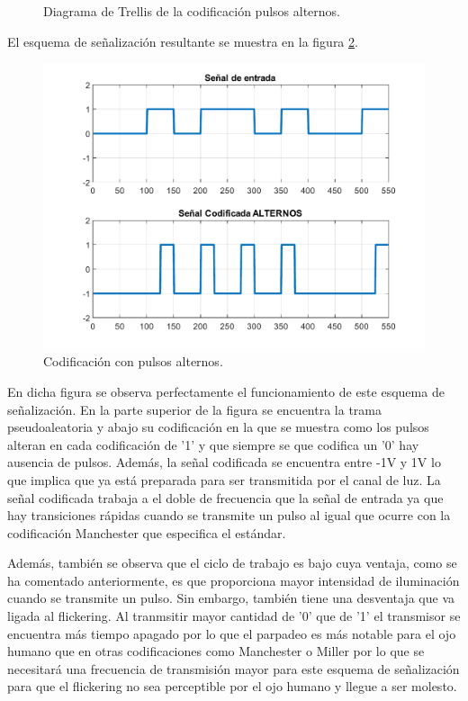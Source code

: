 \begin{figure}[ht]
    \centering
    
    \caption{\small{Diagrama de Trellis de la codificación pulsos alternos.}}
    \label{trellis_alternos}%
\end{figure}

El esquema de señalización resultante se muestra en la figura \ref{codificacion_alternos}.

\begin{figure}[ht]
    \centering
    \includegraphics[scale=0.5]{./figuras/CodificadaAlternos.pdf}
    \caption{\small{Codificación con pulsos alternos.}}
    \label{codificacion_alternos}%
\end{figure}

En dicha figura se observa perfectamente el funcionamiento de este esquema de 
señalización. En la parte superior de la figura se encuentra la trama pseudoaleatoria y 
abajo su codificación en la que se muestra como los pulsos alteran en cada codificación 
de '1' y que siempre se que codifica un '0' hay ausencia de pulsos. Además, la señal 
codificada se encuentra entre -1V y 1V lo que implica que ya está preparada para ser 
transmitida por el canal de luz. La señal codificada trabaja a el doble de frecuencia que 
la señal de entrada ya que hay transiciones rápidas cuando se transmite un pulso al igual
que ocurre con la codificación Manchester que especifica el estándar.

Además, también se observa que el ciclo de trabajo es bajo cuya ventaja, como se ha 
comentado anteriormente, es que proporciona mayor intensidad de iluminación cuando se 
transmite un pulso. Sin embargo, también tiene una desventaja que va ligada al flickering.
Al tranmsitir mayor cantidad de '0' que de '1' el transmisor se encuentra más tiempo 
apagado por lo que el parpadeo es más notable para el ojo humano que en otras 
codificaciones como Manchester o Miller por lo que se necesitará una frecuencia de 
transmisión mayor para este esquema de señalización para que el flickering no sea 
perceptible por el ojo humano y llegue a ser molesto.

